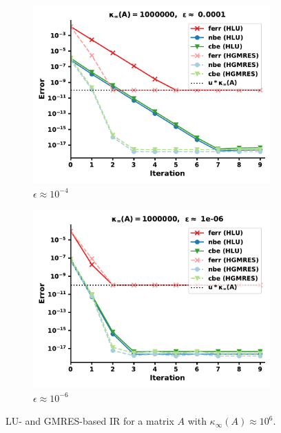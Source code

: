 \begin{figure}[h]
\centering
\begin{subfigure}{.5\textwidth}
  \centering
  \includegraphics[width=\linewidth]{chapters/5_experiments/figures/LR512e2_0.pdf}
  \caption{$\epsilon \approx 10^{-4}$}
  \label{fig:lrir3_1}
\end{subfigure}%
\begin{subfigure}{.5\textwidth}
  \centering
  \includegraphics[width=\linewidth]{chapters/5_experiments/figures/LR512e2_1.pdf}
  \caption{$\epsilon \approx 10^{-6}$}
  \label{fig:lrir3_2}
\end{subfigure}
\caption[Low-Rank IR 3]{LU- and GMRES-based IR for a matrix $A$ with $\kappa_\infty(A) \approx 10^6$.}
\label{fig:lrir3}
\end{figure}

